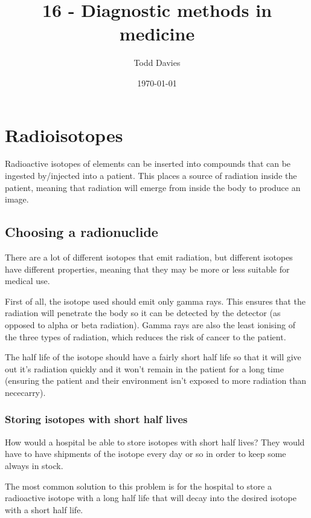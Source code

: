 \documentclass{article}
\title{16 - Diagnostic methods in medicine}
\author{Todd Davies}
\date{\today}
\begin{document}
\lhead{\today}

\maketitle

\section{Radioisotopes}

Radioactive isotopes of elements can be inserted into compounds that can be
ingested by/injected into a patient. This places a source of radiation inside
the patient, meaning that radiation will emerge from inside the body to produce
an image.

\subsection{Choosing a radionuclide}

There are a lot of different isotopes that emit radiation, but different
isotopes have different properties, meaning that they may be more or less
suitable for medical use.

First of all, the isotope used should emit only gamma rays. This ensures that
the radiation will penetrate the body so it can be detected by the detector (as
opposed to alpha or beta radiation). Gamma rays are also the least ionising of
the three types of radiation, which reduces the risk of cancer to the patient.

The half life of the isotope should have a fairly short half life so that it
will give out it's radiation quickly and it won't remain in the patient for a
long time (ensuring the patient and their environment isn't exposed to more
radiation than nececarry).

\subsubsection{Storing isotopes with short half lives}

How would a hospital be able to store isotopes with short half lives? They would
have to have shipments of the isotope every day or so in order to keep some
always in stock.

The most common solution to this problem is for the hospital to store a
radioactive isotope with a long half life that will decay into the desired
isotope with a short half life.
\end{document}
